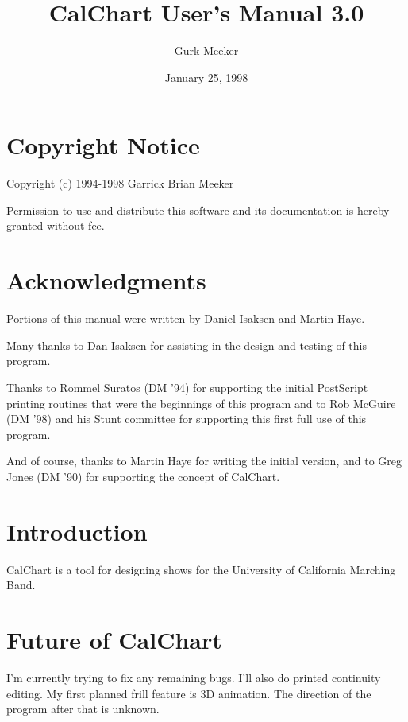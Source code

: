 \title{CalChart User's Manual 3.0}
\author{Gurk Meeker}
\date{January 25, 1998}
\makeindex

\maketitle
\tableofcontents

\chapter*{Copyright Notice}\label{copyright}

Copyright (c) 1994-1998 Garrick Brian Meeker

Permission to use and distribute this software and its documentation is
hereby granted without fee.

\chapter*{Acknowledgments}\label{acknowledge}

Portions of this manual were written by Daniel Isaksen and Martin Haye.

Many thanks to Dan Isaksen for assisting in the design and testing of
this program.

Thanks to Rommel Suratos (DM '94) for supporting the initial PostScript
printing routines that were the beginnings of this program and to Rob
McGuire (DM '98) and his Stunt committee for supporting this first full
use of this program.

And of course, thanks to Martin Haye for writing the initial version,
and to Greg Jones (DM '90) for supporting the concept of CalChart.

\chapter{Introduction}

CalChart is a tool for designing shows for the University of California
Marching Band.







\chapter{Future of CalChart}\label{future}

I'm currently trying to fix any remaining bugs.  I'll also do printed
continuity editing.  My first planned frill feature is 3D animation.
The direction of the program after that is unknown.



